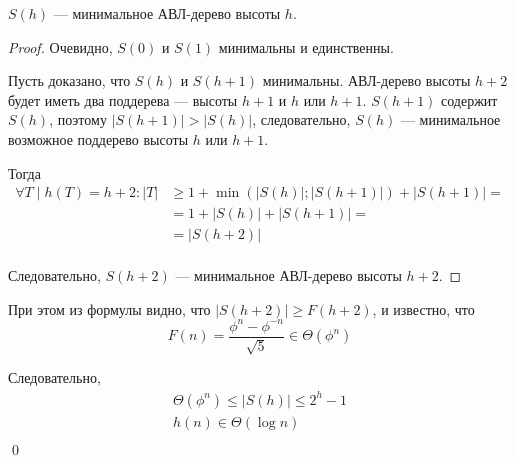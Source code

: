 \begin{statement}
    $S(h)$ --- минимальное АВЛ-дерево высоты $h$.
\end{statement}
\begin{proof}
    Очевидно, $S(0)$ и $S(1)$ минимальны и единственны.

    Пусть доказано, что $S(h)$ и $S(h + 1)$ минимальны.
    АВЛ-дерево высоты $h + 2$ будет иметь два поддерева
    --- высоты $h + 1$ и $h$ или $h + 1$.
    $S(h + 1)$ содержит $S(h)$, поэтому
    $|S(h + 1)| > |S(h)|$, следовательно,
    $S(h)$ --- минимальное возможное поддерево высоты
    $h$ или $h + 1$.

    Тогда
    \begin{align*}
        \forall T \mid h(T) = h + 2 :
        |T| & \ge 1 + \min(|S(h)|; |S(h + 1)|) + |S(h + 1)| = \\
        & = 1 + |S(h)| + |S(h + 1)| = \\
        & = |S(h + 2)| \\
    \end{align*}

    Следовательно, $S(h + 2)$ --- минимальное
    АВЛ-дерево высоты $h + 2$.
\end{proof}

При этом из формулы видно, что
$|S(h + 2)| \ge F(h + 2)$,
и известно, что
\[
    F(n) = \frac{\phi^n - \phi^{-n}}{\sqrt{5}} \in \Theta(\phi^n)
\]

Следовательно,
\begin{gather*}
    \Theta(\phi^n) \le |S(h)| \le 2^h - 1 \\
    h(n) \in \Theta(\log n) \\
\end{gather*}
\qed
